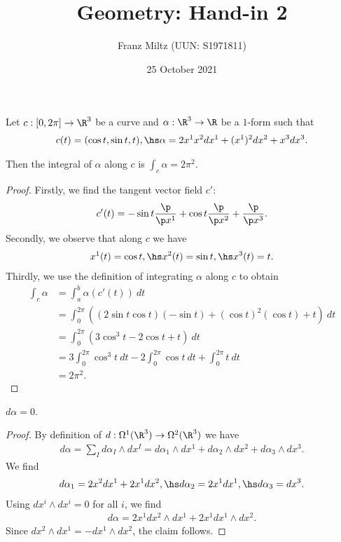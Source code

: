 \documentclass{article}
\begin{document}
\title{Geometry: Hand-in 2}
\author{Franz Miltz (UUN: S1971811)}
\date{25 October 2021}
\maketitle
\noindent Let $c:[0,2\pi] \to \R^3$ be a curve and $\alpha:\R^3\to\R$ be a $1$-form
such that
\begin{align*}
   c(t)   = (\cos t, \sin t, t), \hs
   \alpha = 2x^1x^2dx^1 + (x^1)^2dx^2 + x^3dx^3.
\end{align*}

\begin{claim*}
   Then the integral of $\alpha$ along $c$ is $\int_c \alpha = 2\pi^2$.
\end{claim*}
\begin{proof}
   Firstly, we find the tangent vector field $c'$:
   \begin{align*}
      c'(t) = -\sin t\frac{\p }{\p x^1} + \cos t\frac{\p }{\p x^2} + \frac{\p }{\p x^3} .
   \end{align*}
   Secondly, we observe that along $c$ we have
   \begin{align*}
      x^1(t) = \cos t, \hs x^2(t)= \sin t, \hs x^3(t) = t.
   \end{align*}
   Thirdly, we use the definition of integrating $\alpha$ along $c$ to obtain
   \begin{align*}
      \int_c \alpha & = \int_a^b \alpha(c'(t))\:dt                                                        \\
                    & = \int_0^{2\pi}\left( (2\sin t\cos t)(-\sin t) + (\cos t)^2 (\cos t) + t\right)\:dt \\
                    & = \int_0^{2\pi} \left(3\cos^3 t - 2 \cos t + t\right)\:dt                           \\
                    & = 3\int_0^{2\pi} \cos^3 t\:dt - 2 \int_0^{2\pi} \cos t\: dt + \int_0^{2\pi} t\:dt   \\
                    & = 2\pi^2.
   \end{align*}
\end{proof}

\begin{claim*}
   $d\alpha = 0$.
\end{claim*}
\begin{proof}
   By definition of $d:\Omega^1(\R^3) \to\Omega^2(\R^3)$ we have
   \begin{align*}
      d\alpha =\sum_I d\alpha_I\wedge dx^I
      = d\alpha_1\wedge dx^1 + d\alpha_2\wedge dx^2 + d\alpha_3\wedge dx^3.
   \end{align*}
   We find
   \begin{align*}
      d\alpha_1 = 2x^2dx^1 + 2x^1dx^2, \hs
      d\alpha_2 = 2x^1dx^1, \hs
      d\alpha_3 = dx^3.
   \end{align*}
   Using $dx^i\wedge dx^i=0$ for all $i$, we find
   \begin{align*}
      d\alpha = 2x^1dx^2\wedge dx^1 + 2x^1dx^1\wedge dx^2.
   \end{align*}
   Since $dx^2\wedge dx^1=-dx^1\wedge dx^2$, the claim follows.
\end{proof}
\end{document}
